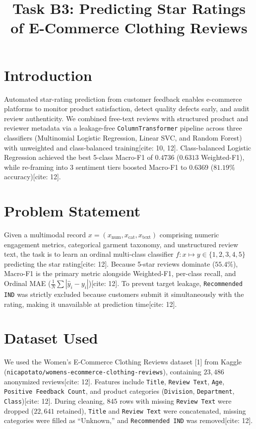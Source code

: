 \documentclass[10pt,twocolumn,a4paper]{IEEEtran}
\title{\vspace{-0.3cm}Task B3: Predicting Star Ratings of E-Commerce Clothing Reviews\vspace{-0.2cm}}
\author{
    \IEEEauthorblockN{KAINAT \quad Roll No. 70176544 \quad | \quad Section C}
    \IEEEauthorblockA{
        Department of Intelligent Systems, The University of Lahore \quad | \quad AI-101 Intro to AI (Instructor: Dr. Muhammad Awais) \\
        Repository: \url{https://github.com/70176544-sketch/AI101-ML-Assignment-70176544}
    }
}
\begin{document}
\maketitle

\section{Introduction}
Automated star-rating prediction from customer feedback enables e-commerce platforms to monitor product satisfaction, detect quality defects early, and audit review authenticity. We combined free-text reviews with structured product and reviewer metadata via a leakage-free \texttt{ColumnTransformer} pipeline across three classifiers (Multinomial Logistic Regression, Linear SVC, and Random Forest) with unweighted and class-balanced training[cite: 10, 12]. Class-balanced Logistic Regression achieved the best 5-class Macro-F1 of $0.4736$ ($0.6313$ Weighted-F1), while re-framing into 3 sentiment tiers boosted Macro-F1 to $0.6369$ ($81.19\%$ accuracy)[cite: 12].

\section{Problem Statement}
Given a multimodal record $x = (x_{\text{num}}, x_{\text{cat}}, x_{\text{text}})$ comprising numeric engagement metrics, categorical garment taxonomy, and unstructured review text, the task is to learn an ordinal multi-class classifier $f: x \mapsto y \in \{1, 2, 3, 4, 5\}$ predicting the star rating[cite: 12]. Because 5-star reviews dominate ($55.4\%$), Macro-F1 is the primary metric alongside Weighted-F1, per-class recall, and Ordinal MAE ($\frac{1}{N}\sum |\hat{y}_i - y_i|$)[cite: 12]. To prevent target leakage, \texttt{Recommended IND} was strictly excluded because customers submit it simultaneously with the rating, making it unavailable at prediction time[cite: 12].

\section{Dataset Used}
We used the Women's E-Commerce Clothing Reviews dataset [1] from Kaggle (\texttt{nicapotato/womens-ecommerce-clothing-reviews}), containing $23,486$ anonymized reviews[cite: 12]. Features include \texttt{Title}, \texttt{Review Text}, \texttt{Age}, \texttt{Positive Feedback Count}, and product categories (\texttt{Division}, \texttt{Department}, \texttt{Class})[cite: 12]. During cleaning, $845$ rows with missing \texttt{Review Text} were dropped ($22,641$ retained), \texttt{Title} and \texttt{Review Text} were concatenated, missing categories were filled as ``Unknown,'' and \texttt{Recommended IND} was removed[cite: 12].
\end{document}
